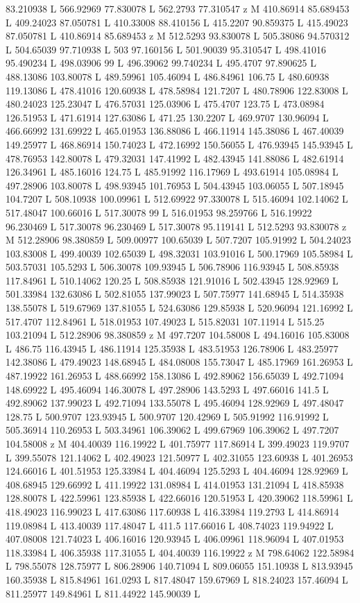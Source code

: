 {\begin{scope}[local bounding box=bb]
{83.210938 L 566.92969 77.830078 L 562.2793 77.310547 z M 410.86914 85.689453 L 409.24023 87.050781 L 410.33008 88.410156 L 415.2207 90.859375 L 415.49023 87.050781 L 410.86914 85.689453 z M 512.5293 93.830078 L 505.38086 94.570312 L 504.65039 97.710938 L 503 97.160156 L 501.90039 95.310547 L 498.41016 95.490234 L 498.03906 99 L 496.39062 99.740234 L 495.4707 97.890625 L 488.13086 103.80078 L 489.59961 105.46094 L 486.84961 106.75 L 480.60938 119.13086 L 478.41016 120.60938 L 478.58984 121.7207 L 480.78906 122.83008 L 480.24023 125.23047 L 476.57031 125.03906 L 475.4707 123.75 L 473.08984 126.51953 L 471.61914 127.63086 L 471.25 130.2207 L 469.9707 130.96094 L 466.66992 131.69922 L 465.01953 136.88086 L 466.11914 145.38086 L 467.40039 149.25977 L 468.86914 150.74023 L 472.16992 150.56055 L 476.93945 145.93945 L 478.76953 142.80078 L 479.32031 147.41992 L 482.43945 141.88086 L 482.61914 126.34961 L 485.16016 124.75 L 485.91992 116.17969 L 493.61914 105.08984 L 497.28906 103.80078 L 498.93945 101.76953 L 504.43945 103.06055 L 507.18945 104.7207 L 508.10938 100.09961 L 512.69922 97.330078 L 515.46094 102.14062 L 517.48047 100.66016 L 517.30078 99 L 516.01953 98.259766 L 516.19922 96.230469 L 517.30078 96.230469 L 517.30078 95.119141 L 512.5293 93.830078 z M 512.28906 98.380859 L 509.00977 100.65039 L 507.7207 105.91992 L 504.24023 103.83008 L 499.40039 102.65039 L 498.32031 103.91016 L 500.17969 105.58984 L 503.57031 105.5293 L 506.30078 109.93945 L 506.78906 116.93945 L 508.85938 117.84961 L 510.14062 120.25 L 508.85938 121.91016 L 502.43945 128.92969 L 501.33984 132.63086 L 502.81055 137.99023 L 507.75977 141.68945 L 514.35938 138.55078 L 519.67969 137.81055 L 524.63086 129.85938 L 520.96094 121.16992 L 517.4707 112.84961 L 518.01953 107.49023 L 515.82031 107.11914 L 515.25 103.21094 L 512.28906 98.380859 z M 497.7207 104.58008 L 494.16016 105.83008 L 486.75 116.43945 L 486.11914 125.35938 L 483.51953 126.78906 L 483.25977 142.38086 L 479.49023 148.68945 L 484.08008 155.73047 L 485.17969 161.26953 L 487.19922 161.26953 L 488.66992 158.13086 L 492.89062 156.65039 L 492.71094 148.69922 L 495.46094 146.30078 L 497.28906 143.5293 L 497.66016 141.5 L 492.89062 137.99023 L 492.71094 133.55078 L 495.46094 128.92969 L 497.48047 128.75 L 500.9707 123.93945 L 500.9707 120.42969 L 505.91992 116.91992 L 505.36914 110.26953 L 503.34961 106.39062 L 499.67969 106.39062 L 497.7207 104.58008 z M 404.40039 116.19922 L 401.75977 117.86914 L 399.49023 119.9707 L 399.55078 121.14062 L 402.49023 121.50977 L 402.31055 123.60938 L 401.26953 124.66016 L 401.51953 125.33984 L 404.46094 125.5293 L 404.46094 128.92969 L 408.68945 129.66992 L 411.19922 131.08984 L 414.01953 131.21094 L 418.85938 128.80078 L 422.59961 123.85938 L 422.66016 120.51953 L 420.39062 118.59961 L 418.49023 116.99023 L 417.63086 117.60938 L 416.33984 119.2793 L 414.86914 119.08984 L 413.40039 117.48047 L 411.5 117.66016 L 408.74023 119.94922 L 407.08008 121.74023 L 406.16016 120.93945 L 406.09961 118.96094 L 407.01953 118.33984 L 406.35938 117.31055 L 404.40039 116.19922 z M 798.64062 122.58984 L 798.55078 128.75977 L 806.28906 140.71094 L 809.06055 151.10938 L 813.93945 160.35938 L 815.84961 161.0293 L 817.48047 159.67969 L 818.24023 157.46094 L 811.25977 149.84961 L 811.44922 145.90039 L }
\end{scope}}
